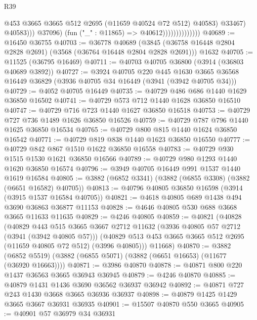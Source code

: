 \begin{lexlean}{R39}
\begin{coremodule}
                                          @453
                                          @3665
                                          @3665
                                          @512
                                          @2695
                                          (@11659 @40524 @72 @512)
                                          @40583)
                                        @33467)
                                      @40583)))
                                @37096)
                              (fun ("_" : @11865) => @40612))))))))))))))
@40689 := @16450 @36755
@40703 := @36778
    @40689
    (@3845 (@36758 @16448 @2804 @2828 @2691) (@3568 (@36764 @16448 @2804 @2828 @2691)))
    @1632
@40705 := @11525 (@36795 @16469)
@40711 := @40703 @40705 @36800 (@3914 (@36803 @40689 @3892))
@40727 := @3924
    @40705
    @220
    @445
    @1630
    @3665
    @36568
    @16449
    @36829
    (@3936 @40705 @34 @16449 (@3941 (@3942 @40705 @34)))
@40729 := @4052 @40705 @16449
@40735 := @40729 @486 @686 @1440 @1629 @36850 @16502
@40741 := @40729 @573 @712 @1440 @1628 @36850 @16510
@40747 := @40729 @716 @723 @1440 @1627 @36850 @16518
@40753 := @40729 @727 @736 @1489 @1626 @36850 @16526
@40759 := @40729 @787 @796 @1440 @1625 @36850 @16534
@40765 := @40729 @800 @815 @1440 @1624 @36850 @16542
@40771 := @40729 @819 @838 @1440 @1623 @36850 @16550
@40777 := @40729 @842 @867 @1510 @1622 @36850 @16558
@40783 := @40729 @930 @1515 @1530 @1621 @36850 @16566
@40789 := @40729 @980 @1293 @1440 @1620 @36850 @16574
@40796 := @3949 @40705 @16449 @991 @1537 @1440 @1619 @16584
@40805 := @3882 (@6852 @3341) (@3882 (@6855 @3308) (@3882 (@6651 @16582) @40705))
@40813 := @40796 @40805 @36850 @16598 (@3914 (@3915 @1537 @16584 @40705))
@40821 := @4618 @40805 @689 @1438 @494 @3690 @36863 @36877 @11153
@40828 := @4646 @40805 @530 @688 @3668 @3665 @11633 @11635
@40829 := @4246 @40805
@40859 := @40821
    (@40828
      (@40829
        @443
        @515
        @3665
        @3667
        @2712
        @11632
        (@3936 @40805 @57 @2712 (@3941 (@3942 @40805 @57)))
        (@40829 @513 @453 @3665 @3665 @512 @2695 (@11659 @40805 @72 @512) (@3996 @40805)))
      @11668)
@40870 := @3882 (@6852 @5519) (@3882 (@6855 @5071) (@3882 (@6651 @16653) (@11677 (@36920 @16663))))
@40871 := @3986 @40870
@40878 := @40871 @800 @220 @1437 @36563 @3665 @36943 @36945
@40879 := @4246 @40870
@40885 := @40879 @1431 @1436 @3690 @36562 @36937 @36942
@40892 := @40871 @727 @243 @1430 @3668 @3665 @36936 @36937
@40898 := @40879 @1425 @1429 @3665 @3667 @36931 @36935
@40901 := @15507 @40870 @550 @3665
@40905 := @40901 @57 @36979 @34 @36931

\end{coremodule}
\end{lexlean}
